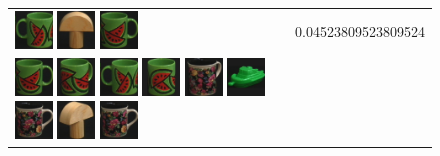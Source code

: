 \begin{figure}[tbp]
\begin{center}
\begin{tabular}{m{11cm} | m{3cm} |}
\includegraphics[width=1cm]{coil/beeld-31.eps}
\includegraphics[width=1cm]{coil/beeld-1.eps}
\includegraphics[width=1cm]{coil/beeld-30.eps}
& {\scriptsize 0.04523809523809524}
\\
\includegraphics[width=1cm]{coil/beeld-30.eps}
\includegraphics[width=1cm]{coil/beeld-33.eps}
\includegraphics[width=1cm]{coil/beeld-31.eps}
\includegraphics[width=1cm]{coil/beeld-32.eps}
\includegraphics[width=1cm]{coil/beeld-63.eps}
\includegraphics[width=1cm]{coil/beeld-57.eps}
\includegraphics[width=1cm]{coil/beeld-60.eps}
\includegraphics[width=1cm]{coil/beeld-3.eps}
\includegraphics[width=1cm]{coil/beeld-60.eps}

\end{tabular}
\end{center}
\end{figure}
